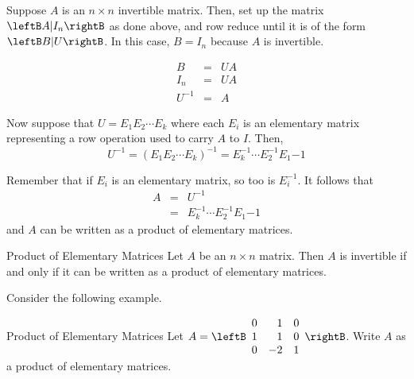 Suppose $A$ is an $n \times n$ invertible matrix. Then, set up the matrix $\leftB A | I_n \rightB$ as done above, and row reduce until it is of the form $\leftB B | U \rightB$. In this case, $B = I_n$ because $A$ is invertible. 

\begin{eqnarray*}
B &=& UA \\
I_n &=& UA \\
U^{-1} &=& A 
\end{eqnarray*}

Now suppose that $U = E_1 E_2 \cdots E_k$ where each $E_i$ is an elementary matrix representing a row operation used to carry $A$ to $I$. Then, 
\[
U^{-1} = \left( E_1 E_2 \cdots E_k \right) ^{-1}  =  E_k^{-1} \cdots E_2^{-1} E_1{-1} 
\]

Remember that if $E_i$ is an elementary matrix, so too is $E_i^{-1}$. 
It follows that 
\begin{eqnarray*}
A&=& U^{-1} \\
&=&  E_k^{-1} \cdots E_2^{-1} E_1{-1}
\end{eqnarray*}
and $A$ can be written as a product of elementary matrices. 

\begin{theorem}{Product of Elementary Matrices}\label{thm:prodelem}
Let $A$ be an $n \times n$ matrix. Then $A$ is invertible if and only if it can be written as a product of elementary matrices.
\end{theorem}

Consider the following example.

\begin{example}{Product of Elementary Matrices}\label{exa:prodelem}
Let $A = \leftB
\begin{array}{rrr}
0 & 1 & 0 \\
1 & 1 & 0 \\
0 & -2 & 1 
\end{array} \rightB$. 
Write $A$ as a product of elementary matrices. 
\end{example}

